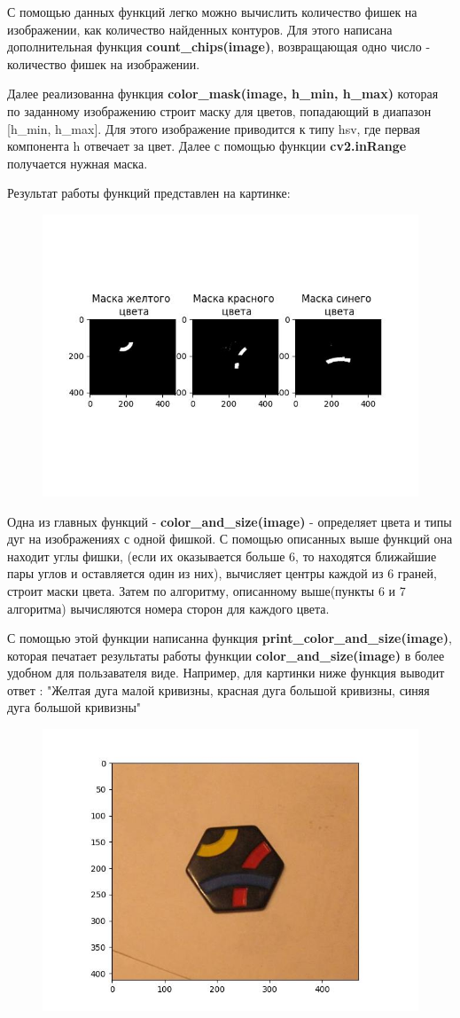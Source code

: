 \documentclass[a4paper, 12pt]{article}
\begin{document}
С помощью данных функций легко можно вычислить количество фишек на изображении, как количество найденных контуров. Для этого написана дополнительная функция \textbf{count\_chips(image)}, возвращающая одно число - количество фишек на изображении.


Далее реализованна функция \textbf{color\_mask(image, h\_min, h\_max)} которая по заданному изображению строит маску для цветов, попадающий в диапазон  [h\_min, h\_max]. Для этого изображение приводится к типу hsv, где первая компонента h отвечает за цвет. Далее с помощью функции \textbf{cv2.inRange} получается нужная маска. 

Результат работы функций представлен на картинке: 

\begin{figure}[H]
        	\centering
        	\includegraphics[width=0.5\linewidth]{mask_y.jpg}
        	\label{fig:mpr_3}
        	\vspace{-25pt}
        	\caption{}
\end{figure}


Одна из главных функций - \textbf{color\_and\_size(image)} - определяет цвета и типы дуг на изображениях с одной фишкой. С помощью описанных выше функций она находит углы фишки, (если их оказывается больше 6, то находятся ближайшие пары углов и оставляется один из них), вычисляет центры каждой из 6 граней, строит маски цвета. Затем по алгоритму, описанному выше(пункты 6 и 7 алгоритма) вычисляются номера сторон для каждого цвета.

С помощью этой функции написанна функция \textbf{print\_color\_and\_size(image)}, которая печатает результаты работы функции \textbf{color\_and\_size(image)} в более удобном для пользавателя виде.
 Например, для картинки ниже функция выводит ответ : "Желтая дуга малой кривизны, красная дуга большой кривизны, синяя дуга большой кривизны"

 \begin{figure}[H]
        	\centering
        	\includegraphics[width=0.5\linewidth]{Single_1.jpg}
        	\label{fig:mpr_4}
        	\vspace{-25pt}
        	\caption{}
\end{figure}
\end{document}
